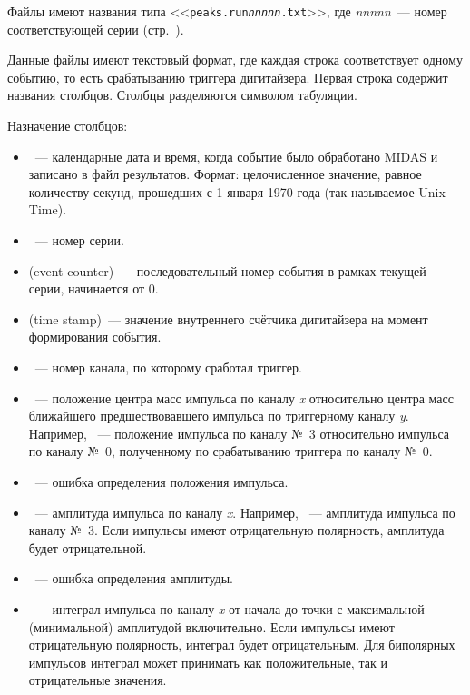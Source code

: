 \documentclass[12pt, a4paper, oneside, onecolumn]{book}
\newcommand{\MIDAS}{\mbox{MIDAS}}
\newcommand{\FILE}[1]{<<{\tt #1}>>}
\begin{document}
Файлы имеют названия типа \FILE{peaks.run{\it nnnnn}.txt}, где {\it nnnnn}~--- номер соответствующей серии (стр.~\pageref{sec-midas-run}).

Данные файлы имеют текстовый формат, где каждая строка соответствует одному событию, то есть срабатыванию триггера дигитайзера. Первая строка содержит названия столбцов. Столбцы разделяются символом табуляции.

Назначение столбцов:

\begin{itemize}

\item {}~--- календарные дата и время, когда событие было обработано \MIDAS{} и записано в файл результатов. Формат: целочисленное значение, равное количеству секунд, прошедших с 1 января 1970 года (так называемое Unix Time).

\item {}~--- номер серии.

\item {} (event counter)~--- последовательный номер события в рамках текущей серии, начинается от 0.

\item {} (time stamp)~--- значение внутреннего счётчика дигитайзера на момент формирования события.

\item {}~--- номер канала, по которому сработал триггер.

\item {}~--- положение центра масс импульса по каналу {\it x} относительно центра масс ближайшего предшествовавшего импульса по триггерному каналу {\it y}. Например, ~--- положение импульса по каналу №~3 относительно импульса по каналу №~0, полученному по срабатыванию триггера по каналу №~0.

\item {}~--- ошибка определения положения импульса.

\item {}~--- амплитуда импульса по каналу {\it x}. Например, ~--- амплитуда импульса по каналу №~3. Если импульсы имеют отрицательную полярность, амплитуда будет отрицательной.

\item {}~--- ошибка определения амплитуды.

\item {}~--- интеграл импульса по каналу {\it x} от начала до точки с максимальной (минимальной) амплитудой включительно. Если импульсы имеют отрицательную полярность, интеграл будет отрицательным. Для биполярных импульсов интеграл может принимать как положительные, так и отрицательные значения.


\end{itemize}
\end{document}

